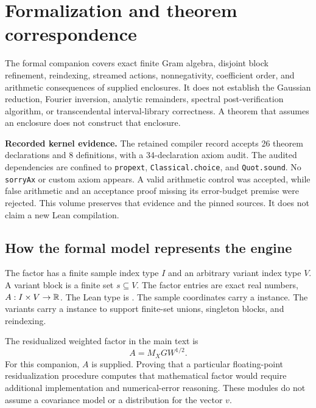 \chapter{Formalization and theorem correspondence}\label{app:lean}
The formal companion covers exact finite Gram algebra, disjoint block
refinement, reindexing, streamed actions, nonnegativity, coefficient order,
and arithmetic consequences of supplied enclosures. It does not establish
the Gaussian reduction, Fourier inversion, analytic remainders, spectral
post-verification algorithm, or transcendental interval-library correctness.
A theorem that assumes an enclosure does not construct that enclosure.

\begin{scopebox}
\textbf{Recorded kernel evidence.} The retained compiler record accepts
26 theorem declarations and 8 definitions, with a 34-declaration axiom audit.
The audited dependencies are confined to \texttt{propext},
\texttt{Classical.choice}, and \texttt{Quot.sound}. No \texttt{sorryAx} or
custom axiom appears. A valid arithmetic control was accepted, while false
arithmetic and an acceptance proof missing its error-budget premise were
rejected. This volume preserves that evidence and the pinned sources. It
does not claim a new Lean compilation.
\end{scopebox}

\label{app:lean-contract}
\section{How the formal model represents the engine}

The factor has a finite sample index type $I$ and an arbitrary variant index
 type $V$. A variant block is a finite set $s\subseteq V$. The factor entries
are exact real numbers, $A:I\times V\to\mathbb R$. The Lean type is
. The sample coordinates carry a
 instance. The variants carry a  instance to
support finite-set unions, singleton blocks, and reindexing.

The residualized weighted factor in the main text is
\[
 A=M_X G W^{1/2}.
\]
For this companion, $A$ is supplied. Proving that a particular floating-point
residualization procedure computes that mathematical factor would require
additional implementation and numerical-error reasoning. These modules do
not assume a covariance model or a distribution for the vector $v$.

